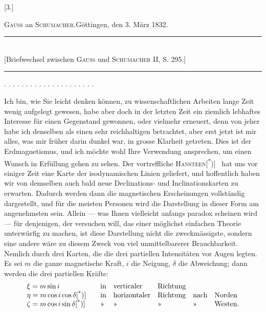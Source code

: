 \clearpage\begingroup{}
\begin{center}[3.]\end{center}
\begin{center}\textsc{Gauss} an \textsc{Schumacher}.\quad Göttingen, den 3. März 1832.\end{center}
\begin{center}
\rule{.70\textwidth}{.4pt}\\
{\small [Briefwechsel zwischen \textsc{Gauss} und \textsc{Schumacher} II, S. 295.]}\\[-.3ex]
\rule{.70\textwidth}{.4pt}
\end{center}
\noindent . . . . . . . . . . . . . . . . . . . . .\par
\indent Ich bin, wie Sie leicht denken können, zu wissenschaftlichen Arbeiten lange
Zeit wenig aufgelegt gewesen, habe aber doch in der letzten Zeit ein ziemlich
lebhaftes Interesse für einen Gegenstand gewonnen, oder vielmehr erneuert,
denn von jeher habe ich denselben als einen sehr reichhaltigen betrachtet,
aber erst jetzt ist mir alles, was mir früher darin dunkel war, in grosse Klarheit
getreten. Dies ist der Erdmagnetismus, und ich möchte wohl Ihre Verwendung
ansprechen, um einen Wunsch in Erfüllung gehen zu sehen. Der
vortreffliche \textsc{Hansteen}[\textsuperscript{*})]\begingroup\renewcommand{\thefootnote}{}
\endgroup\ hat uns vor einiger Zeit eine Karte der isodynamischen
Linien geliefert, und hoffentlich haben wir von demselben auch bald neue
\clearpage{}
\noindent Declinations- und Inclinationskarten zu erwarten. Dadurch werden dann die
magnetischen Erscheinungen vollständig dargestellt, und für die meisten Personen
wird die Darstellung in dieser Form am angenehmsten sein. Allein
— was Ihnen vielleicht anfangs paradox scheinen wird — für denjenigen, der
versuchen will, das  einer möglichst einfachen
Theorie unterwürfig zu machen, ist diese Darstellung nicht die zweckmässigste,
sondern eine andere wäre zu diesem Zweck von viel unmittelbarerer Brauchbarkeit.
Nemlich durch drei Karten, die die drei partiellen Intensitäten vor
Augen legten. Es sei \(m\) die ganze magnetische Kraft, \(i\) die Neigung, \(\delta\) die
Abweichung; dann werden die drei partiellen Kräfte:
\[
\begin{array}{@{}l@{\qquad}lllll@{}}
\xi=m\sin i & \text{in}&\text{verticaler}&\text{Richtung}&&\\
\eta=m\cos i\cos\delta\text{[\textsuperscript{*})]} &
\text{in}&\text{horizontaler}&\text{Richtung}&\text{nach}&\text{Norden}\\
\zeta=m\cos i\sin\delta\text{[\textsuperscript{*})]} &
\text{»}&\text{»}&\text{»}&\text{»}&\text{Westen.}
\end{array}
\]
\begingroup\renewcommand{\thefootnote}{}
\endgroup

